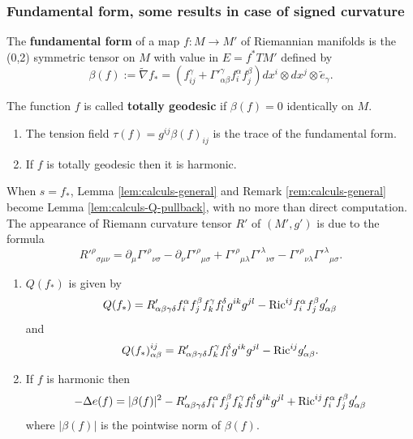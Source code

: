 \subsubsection{Fundamental form, some results in case of signed curvature}
\label{sec:org3c9576f}

\begin{definition}
The \textbf{fundamental form} of a map \(f: M \longrightarrow M'\) of Riemannian manifolds is
the (0,2) symmetric tensor on \(M\) with value in \(E=f^* TM'\) defined by
\[
 \beta(f):= \tilde \nabla f_* = \left(f^\gamma_{ij} + \Gamma'^\gamma_{\alpha\beta}
f^\alpha_i f^\beta_j\right) dx^i\otimes dx^j\otimes \tilde e_\gamma.
\]

The function \(f\) is called \textbf{totally geodesic} if \(\beta(f) = 0\) identically on \(M\).
\end{definition}

\begin{remark}
\begin{enumerate}
\item The tension field \(\tau(f) = g^{ij} \beta(f)_{ij}\) is the trace of the
fundamental form.
\item If \(f\) is totally geodesic then it is harmonic.
\end{enumerate}
\end{remark}

When \(s = f_*\), Lemma \ref{lem:calculs-general} and Remark \ref{rem:calculs-general}
become Lemma \ref{lem:calculs-Q-pullback}, with no more than direct computation. The appearance of Riemann curvature
tensor \(R'\) of \((M',g')\) is due to the formula
\[ R'^\rho{}_{\sigma\mu\nu} = \partial_\mu\Gamma'^\rho{}_{\nu\sigma} -
\partial_\nu\Gamma'^\rho{}_{\mu\sigma} +
\Gamma'^\rho{}_{\mu\lambda}\Gamma'^\lambda{}_{\nu\sigma} -
\Gamma'^\rho{}_{\nu\lambda}\Gamma'^\lambda{}_{\mu\sigma}. \]

\begin{lemma}
\label{lem:calculs-Q-pullback}
\begin{enumerate}
\item \(Q(f_*)\) is given by
\[
   Q(f_*) = R'_{\alpha\beta\gamma\delta} f^\alpha_i f^\beta_j f^\gamma_k f^\delta_l
   g^{ik}g^{jl} - {\rm Ric}^{ij}f_i^\alpha f^\beta_j g'_{\alpha\beta}
   \]
and
\[
   Q(f_*)_{\alpha\beta}^{ij} = R'_{\alpha\beta\gamma\delta}f^\gamma_k f^\delta_l g^{ik}g^{jl}
   -{\rm Ric}^{ij}g'_{\alpha\beta}.
   \]
\item If \(f\) is harmonic then 
\[
    -\Delta e(f) = |\beta(f)|^2 - R'_{\alpha\beta\gamma\delta} f^\alpha_i f^\beta_j f^\gamma_k f^\delta_l
   g^{ik}g^{jl} + {\rm Ric}^{ij}f_i^\alpha f^\beta_j g'_{\alpha\beta}
   \]
 where \(|\beta(f)|\) is the pointwise norm of \(\beta(f)\).
\end{enumerate}
\end{lemma}


